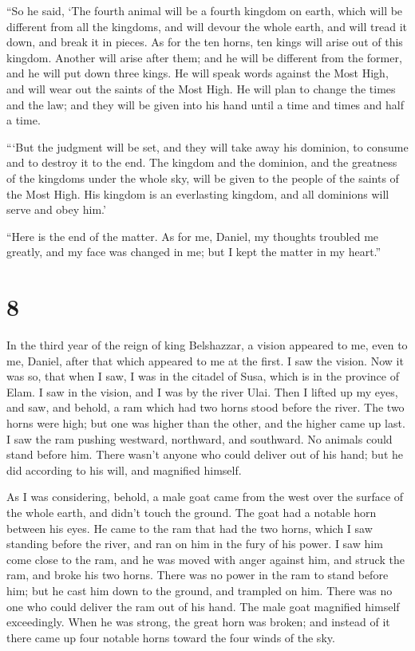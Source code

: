  ``So he said, `The fourth animal will be a fourth kingdom
on earth, which will be different from all the kingdoms, and will devour
the whole earth, and will tread it down, and break it in pieces.
 As for the ten horns, ten kings will arise out of this
kingdom. Another will arise after them; and he will be different from
the former, and he will put down three kings.  He will
speak words against the Most High, and will wear out the saints of the
Most High. He will plan to change the times and the law; and they will
be given into his hand until a time and times and half a time.

 ```But the judgment will be set, and they will take away
his dominion, to consume and to destroy it to the end.  The
kingdom and the dominion, and the greatness of the kingdoms under the
whole sky, will be given to the people of the saints of the Most High.
His kingdom is an everlasting kingdom, and all dominions will serve and
obey him.'

 ``Here is the end of the matter. As for me, Daniel, my
thoughts troubled me greatly, and my face was changed in me; but I kept
the matter in my heart.''

\hypertarget{section-7}{%
\section{8}\label{section-7}}

 In the third year of the reign of king Belshazzar, a vision
appeared to me, even to me, Daniel, after that which appeared to me at
the first.  I saw the vision. Now it was so, that when I
saw, I was in the citadel of Susa, which is in the province of Elam. I
saw in the vision, and I was by the river Ulai.  Then I
lifted up my eyes, and saw, and behold, a ram which had two horns stood
before the river. The two horns were high; but one was higher than the
other, and the higher came up last.  I saw the ram pushing
westward, northward, and southward. No animals could stand before him.
There wasn't anyone who could deliver out of his hand; but he did
according to his will, and magnified himself.

 As I was considering, behold, a male goat came from the
west over the surface of the whole earth, and didn't touch the ground.
The goat had a notable horn between his eyes.  He came to
the ram that had the two horns, which I saw standing before the river,
and ran on him in the fury of his power.  I saw him come
close to the ram, and he was moved with anger against him, and struck
the ram, and broke his two horns. There was no power in the ram to stand
before him; but he cast him down to the ground, and trampled on him.
There was no one who could deliver the ram out of his hand. 
The male goat magnified himself exceedingly. When he was strong, the
great horn was broken; and instead of it there came up four notable
horns toward the four winds of the sky.

